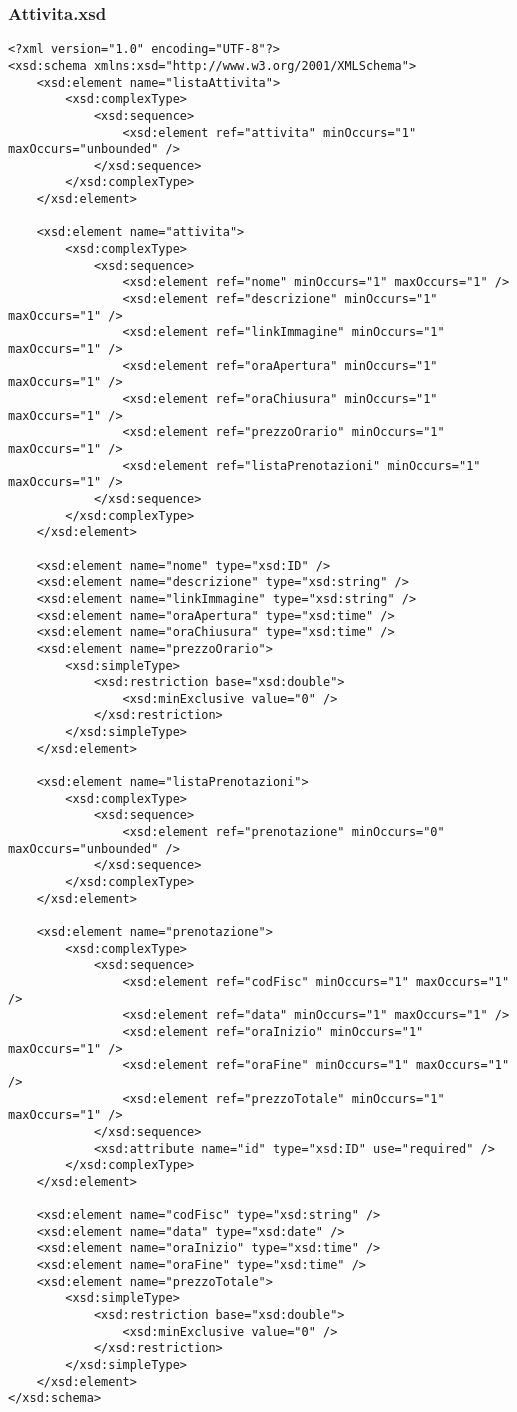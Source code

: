 \documentclass [a4paper, 12pt]{book}
\begin{document}
\subsubsection{Attivita.xsd}
\begin{lstlisting}[style=XML]
<?xml version="1.0" encoding="UTF-8"?>
<xsd:schema xmlns:xsd="http://www.w3.org/2001/XMLSchema">
    <xsd:element name="listaAttivita">
        <xsd:complexType>
            <xsd:sequence>
                <xsd:element ref="attivita" minOccurs="1" maxOccurs="unbounded" />
            </xsd:sequence>
        </xsd:complexType>
    </xsd:element>

    <xsd:element name="attivita">
        <xsd:complexType>
            <xsd:sequence>
                <xsd:element ref="nome" minOccurs="1" maxOccurs="1" />
                <xsd:element ref="descrizione" minOccurs="1" maxOccurs="1" />
                <xsd:element ref="linkImmagine" minOccurs="1" maxOccurs="1" />
                <xsd:element ref="oraApertura" minOccurs="1" maxOccurs="1" />
                <xsd:element ref="oraChiusura" minOccurs="1" maxOccurs="1" />
                <xsd:element ref="prezzoOrario" minOccurs="1" maxOccurs="1" />
                <xsd:element ref="listaPrenotazioni" minOccurs="1" maxOccurs="1" />
            </xsd:sequence>
        </xsd:complexType>
    </xsd:element>

    <xsd:element name="nome" type="xsd:ID" />
    <xsd:element name="descrizione" type="xsd:string" />
    <xsd:element name="linkImmagine" type="xsd:string" />
    <xsd:element name="oraApertura" type="xsd:time" />
    <xsd:element name="oraChiusura" type="xsd:time" />
    <xsd:element name="prezzoOrario">
        <xsd:simpleType>
            <xsd:restriction base="xsd:double">
                <xsd:minExclusive value="0" />
            </xsd:restriction>
        </xsd:simpleType>
    </xsd:element>

    <xsd:element name="listaPrenotazioni">
        <xsd:complexType>
            <xsd:sequence>
                <xsd:element ref="prenotazione" minOccurs="0" maxOccurs="unbounded" /> 
            </xsd:sequence>
        </xsd:complexType>
    </xsd:element>

    <xsd:element name="prenotazione">
        <xsd:complexType>
            <xsd:sequence>
                <xsd:element ref="codFisc" minOccurs="1" maxOccurs="1" />
                <xsd:element ref="data" minOccurs="1" maxOccurs="1" />
                <xsd:element ref="oraInizio" minOccurs="1" maxOccurs="1" />
                <xsd:element ref="oraFine" minOccurs="1" maxOccurs="1" />
                <xsd:element ref="prezzoTotale" minOccurs="1" maxOccurs="1" />
            </xsd:sequence>
            <xsd:attribute name="id" type="xsd:ID" use="required" />
        </xsd:complexType>
    </xsd:element>

    <xsd:element name="codFisc" type="xsd:string" />
    <xsd:element name="data" type="xsd:date" />
    <xsd:element name="oraInizio" type="xsd:time" />
    <xsd:element name="oraFine" type="xsd:time" />
    <xsd:element name="prezzoTotale">
        <xsd:simpleType>
            <xsd:restriction base="xsd:double">
                <xsd:minExclusive value="0" />
            </xsd:restriction>
        </xsd:simpleType>
    </xsd:element>
</xsd:schema>
\end{lstlisting}
\end{document}
